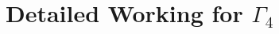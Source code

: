 




\clearpage
\renewcommand{\thepage}{B\arabic{page}}
\setcounter{page}{1}
\section{Detailed Working for \texorpdfstring{$\Gamma_4$}{Gamma 4}}

